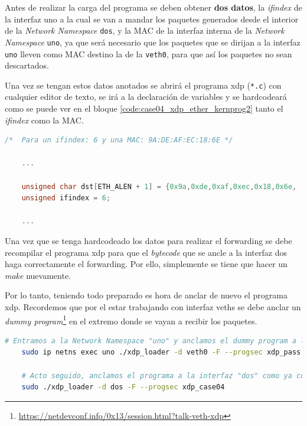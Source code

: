 Antes de realizar la carga del programa se deben obtener \textbf{dos datos}, la \textit{ifindex} de la interfaz uno a la cual se van a mandar los paquetes generados desde el interior de la \textit{Network Namespace} \texttt{dos}, y la MAC de la interfaz interna de la \textit{Network Namespace} \texttt{uno}, ya que será necesario que los paquetes que se dirijan a la interfaz \texttt{uno} lleven como MAC destino la de la \texttt{veth0}, para que así los paquetes no sean descartados.\\
\par
Una vez se tengan estos datos anotados se abrirá el programa \gls{xdp} (\texttt{*.c}) con cualquier editor de texto, se irá a la declaración de variables y se hardcodeará como se puede ver en el bloque \ref{code:case04_xdp_ether_kernprog2} tanto el \textit{ifindex} como la MAC.
\par

\begin{lstlisting}[language=C, style=C-color, caption={Ejemplo MAC e Ifindex - Case04},label=code:case04_xdp_ether_kernprog2]
    /*  Para un ifindex: 6 y una MAC: 9A:DE:AF:EC:18:6E */

    ...
    
    unsigned char dst[ETH_ALEN + 1] = {0x9a,0xde,0xaf,0xec,0x18,0x6e, '\0'} ;
    unsigned ifindex = 6; 

    ...
\end{lstlisting}
\vspace{0.5cm}
Una vez que se tenga hardcodeado los datos para realizar el forwarding se debe recompilar el programa \gls{xdp} para que el \textit{bytecode} que se ancle a la interfaz dos haga correctamente el forwarding. Por ello, simplemente se tiene que hacer un \textit{make} nuevamente.\\
\par
Por lo tanto, teniendo todo preparado es hora de anclar de nuevo el programa \gls{xdp}. Recordemos que por el estar trabajando con interfaz \gls{veth}s se debe anclar un \textit{dummy program}\footnote{\url{https://netdevconf.info/0x13/session.html?talk-veth-xdp}} en el extremo donde se vayan a recibir los paquetes.
\begin{lstlisting}[language= bash, style=Consola, caption={Carga del programa XDP Hardcoded forwarding - Case04},label=code:case04_xdp_ether_load1]
    # Entramos a la Network Namespace "uno" y anclamos el dummy program a la interfaz veth0
    sudo ip netns exec uno ./xdp_loader -d veth0 -F --progsec xdp_pass
    
    # Acto seguido, anclamos el programa a la interfaz "dos" como ya comentábamos antes
    sudo ./xdp_loader -d dos -F --progsec xdp_case04
\end{lstlisting}


